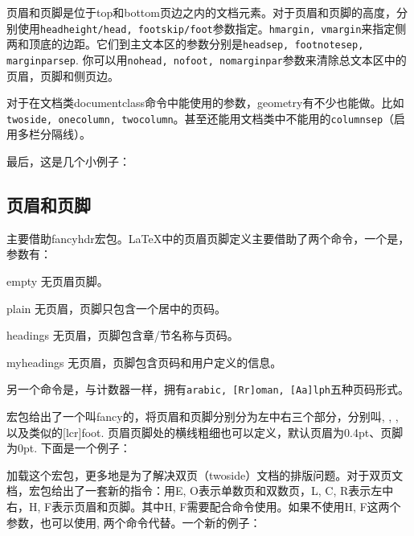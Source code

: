 页眉和页脚是位于top和bottom页边之内的文档元素。对于页眉和页脚的高度，分别使用\texttt{headheight/head, footskip/foot}参数指定。\texttt{hmargin, vmargin}来指定侧两和顶底的边距。它们到主文本区的参数分别是\texttt{headsep, footnotesep, marginparsep}. 你可以用\texttt{nohead, nofoot, nomarginpar}参数来清除总文本区中的页眉，页脚和侧页边。

对于在文档类documentclass命令中能使用的参数，geometry有不少也能做。比如\texttt{twoside, onecolumn, twocolumn}。甚至还能用文档类中不能用的\texttt{columnsep}（启用多栏分隔线）。

最后，这是几个小例子：
\begin{latex}
\usepackage[hmargin=1.25in,vmargin=1in]{geometry}
\usepackage[inner=1in,outer=1.25in]{geometry}
\end{latex}

\subsection{页眉和页脚}
主要借助fancyhdr宏包。\LaTeX 中的页眉页脚定义主要借助了两个命令，一个是，参数有：
\begin{para}
\item[empty] 无页眉页脚。
\item[plain] 无页眉，页脚只包含一个居中的页码。
\item[headings] 无页眉，页脚包含章/节名称与页码。
\item[myheadings] 无页眉，页脚包含页码和用户定义的信息。
\end{para}

另一个命令是，与计数器一样，拥有\texttt{arabic, [Rr]oman, [Aa]lph}五种页码形式。

宏包给出了一个叫fancy的，将页眉和页脚分别分为左中右三个部分，分别叫, , , 以及类似的[lcr]foot. 页眉页脚处的横线粗细也可以定义，默认页眉为0.4pt、页脚为0pt. 下面是一个例子：
\begin{latex}
\usepackage{fancyhdr}
\pagestyle{fancy}
    \lhead{}
    \chead{}
    \cfoot{\thepage}
\renewcommand{\headrulewidth}{0.4pt}
\renewcommand{\footrulewidth}{0.4pt}
\end{latex}

加载这个宏包，更多地是为了解决双页（twoside）文档的排版问题。对于双页文档，宏包给出了一套新的指令：用E, O表示单数页和双数页，L, C, R表示左中右，H, F表示页眉和页脚。其中H, F需要配合命令使用。如果不使用H, F这两个参数，也可以使用,  两个命令代替。一个新的例子：
\begin{latex}
\fancyhead{} %
\fancyfoot{} %
    \fancyfoot[C]{\thepage}
\end{latex}

